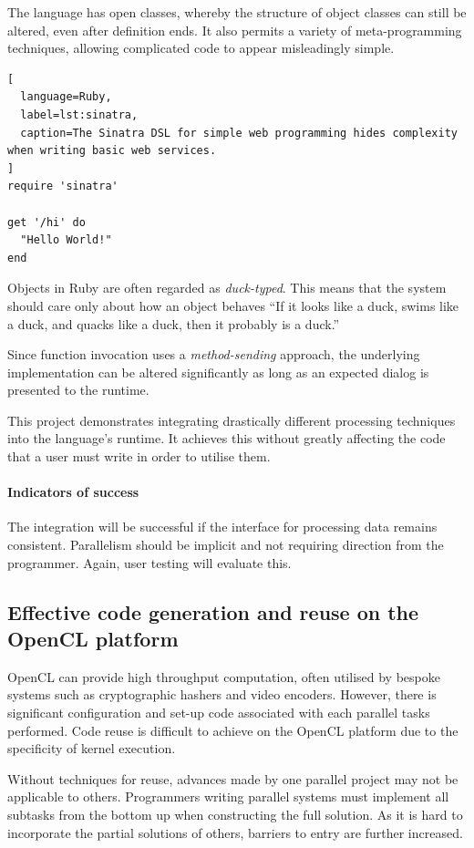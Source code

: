 The language has open classes, whereby the structure of object classes can still be altered, even after definition ends. It also permits a variety of meta-programming techniques, allowing complicated code to appear misleadingly simple.

\begin{lstlisting}[
  language=Ruby,
  label=lst:sinatra,
  caption=The Sinatra DSL for simple web programming hides complexity when writing basic web services.
]
require 'sinatra'

get '/hi' do
  "Hello World!"
end
\end{lstlisting}

Objects in Ruby are often regarded as \emph{duck-typed}. This means that the system should care only about how an object behaves \textemdash{} ``If it looks like a duck, swims like a duck, and quacks like a duck, then it probably is a duck.''\cite{ducktest}

Since function invocation uses a \emph{method-sending} approach, the underlying implementation can be altered significantly as long as an expected dialog is presented to the runtime.

This project demonstrates integrating drastically different processing techniques into the language's runtime. It achieves this without greatly affecting the code that a user must write in order to utilise them.

\paragraph*{Indicators of success}
The integration will be successful if the interface for processing data remains consistent. Parallelism should be implicit and not requiring direction from the programmer. Again, user testing will evaluate this.

\subsection{Effective code generation and reuse on the OpenCL platform}
\ac{OpenCL} can provide high throughput computation, often utilised by bespoke systems such as cryptographic hashers and video encoders. However, there is significant configuration and set-up code associated with each parallel tasks performed. Code reuse is difficult to achieve on the \ac{OpenCL} platform due to the specificity of kernel execution.

Without techniques for reuse, advances made by one parallel project may not be applicable to others. Programmers writing parallel systems must implement all subtasks from the bottom up when constructing the full solution. As it is hard to incorporate the partial solutions of others, barriers to entry are further increased.

